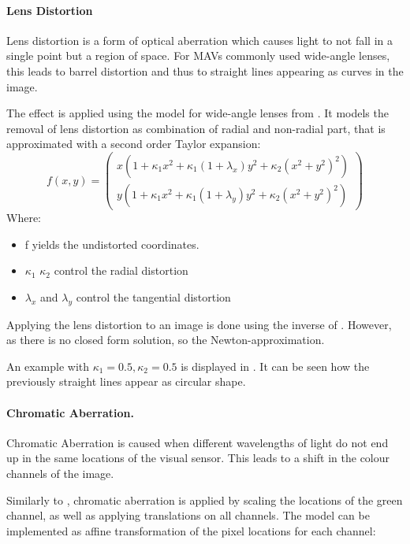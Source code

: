 \paragraph{Lens Distortion}

Lens distortion is a form of optical aberration which causes light to not fall in a single point but a region of space. For \acp{MAV} commonly used wide-angle lenses, this leads to barrel distortion and thus to straight lines appearing as curves in the image.

The effect is applied using the model for wide-angle lenses from \cite{Vass}. It models the removal of lens distortion as combination of radial and non-radial part, that is approximated with a second order Taylor expansion:
\begin{equation}
f(x,y) =
\begin{pmatrix}
x (1 + \kappa_1 x^2 + \kappa_1 (1 + \lambda_x) y^2 + \kappa_2(x^2 + y^2)^2) \\
y (1 + \kappa_1 x^2 + \kappa_1 (1 + \lambda_y) y^2 + \kappa_2(x^2 + y^2)^2)
\end{pmatrix} 
\label{eq:distortion}
\end{equation}
Where:
\begin{itemize}
	\item f yields the undistorted coordinates.
	\item $\kappa_1$ $\kappa_2$ control the radial distortion 
	\item $\lambda_x$ and $\lambda_y$ control the tangential distortion
\end{itemize}

Applying the lens distortion to an image is done using the inverse of . However, as there is no closed form solution, so the Newton-approximation.

An example with $\kappa_1 = 0.5, \kappa_2 = 0.5$ is displayed in . It can be seen how the previously straight lines appear as circular shape.

\paragraph{Chromatic Aberration.}

Chromatic Aberration is caused when different wavelengths of light do not end up in the same locations of the visual sensor. This leads to a shift in the colour channels of the image.

Similarly to \cite{Carlson2018}, chromatic aberration is applied by scaling the locations of the green channel, as well as applying translations on all channels. The model can be implemented as affine transformation of the pixel locations for each channel:

